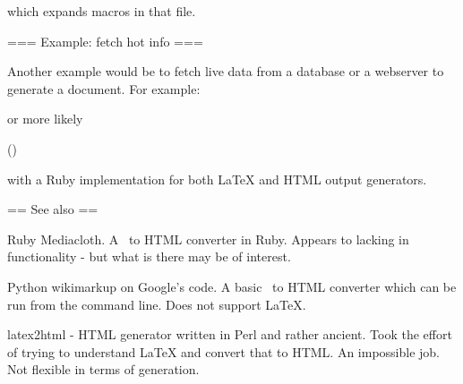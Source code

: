 
which expands macros in that file.

=== Example: fetch hot info ===

Another example would be to fetch live data from a database or a
webserver to generate a document. For example:


or more likely

  \userinfo(\username)

with a Ruby implementation for both LaTeX and HTML output generators.


== See also ==

Ruby Mediacloth. A \mediawiki\ to HTML converter in Ruby. Appears to
lacking in functionality - but what is there may be of interest.

Python wikimarkup on Google's code. A basic \mediawiki\ to HTML
converter which can be run from the command line. Does not support
LaTeX.

latex2html - HTML generator written in Perl and rather ancient. Took
the effort of trying to understand LaTeX and convert that to HTML. An
impossible job. Not flexible in terms of generation.
